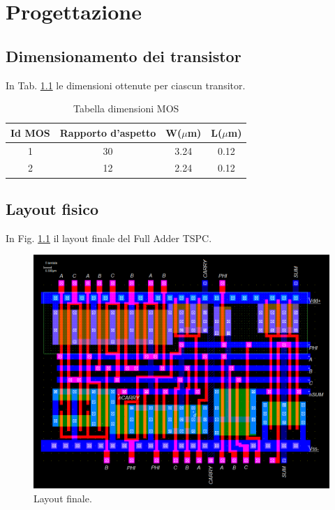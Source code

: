 
\chapter{Progettazione} %
\label{Chapter3} 

\section{Dimensionamento dei transistor}
\label{sec:dimensionamento}

In Tab. \ref{tab:dimensioniMos} le dimensioni ottenute per ciascun transitor.

\begin{table}[htb]
	\centering
	\begin{tabular}{c*{3}{c}}
		\toprule
		Id MOS & Rapporto d'aspetto & W($\mu$m) & L($\mu$m)\\
		\midrule
		1 & 30 & 3.24 & 0.12\\
		2 & 12 & 2.24 & 0.12\\
		\bottomrule
	\end{tabular}
	\caption{Tabella dimensioni MOS}
	\label{tab:dimensioniMos}
\end{table}

\section{Layout fisico}
\label{sec:layout}

In Fig. \ref{fig:layout} il layout finale del Full Adder TSPC.

\begin{figure}[hbt!]
	\centering
	\includegraphics[width=1\textwidth]{figure/Msk_FullDesign.png}
	\caption{Layout finale.}
	\label{fig:layout}
\end{figure}





